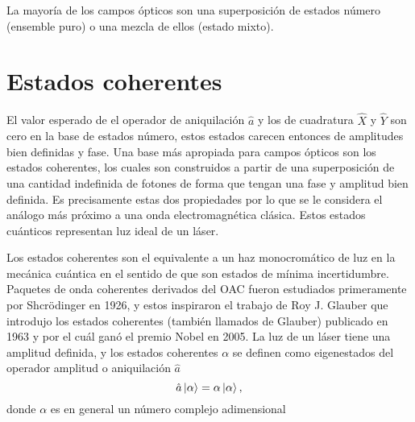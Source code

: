 La mayoría de los campos ópticos son una superposición de estados número (ensemble puro) o una mezcla de ellos (estado mixto).
\iffalse
  donde se considera la aportación de la energía del vacío. Usando la relación de conmutación de $\hat{a}$ y $\hat{a}^{\dagger}$ sobre el estado vacío $(\hat{a}\hat{a}^{\dagger}-\hat{a}^{\dagger}\hat{a})\ket{0} = \hat{a}\hat{a}^{\dagger}\ket{0} = \ket{0}$ implica que $\hat{a}^{\dagger}\hat{a}(\hat{a}^{\dagger}\ket{0}) = \hat{a}^{\dagger}\ket{0}$, por lo que $\hat{a}^{\dagger}\ket{0}$ es un eigenestado de $\hat{a}^{\dagger}\hat{a}$ con valor propio 1, a este estado se le denomina estado de un fotón y se denota como $\ket{1} = \hat{a}^{\dagger}\ket{0}$. De forma análoga, se puede obtener el n-ésimo estado de $n$ fotones $\ket{n}$ de forma inductiva, lo que resulta en
  \begin{equation*}
    \ket{n} = \frac{\hat{a}^{\dagger\,n}}{\sqrt{n!}}\ket{0}
  \end{equation*}
\fi
\section{Estados coherentes}
El valor esperado de el operador de aniquilación $\hat{a}$ y los de cuadratura $\hat{X}$ y $\hat{Y}$ son cero en la base de estados número, estos estados carecen entonces de amplitudes bien definidas y fase. Una base más apropiada para campos ópticos son los estados coherentes, los cuales son construidos a partir de una superposición de una cantidad indefinida de fotones de forma que tengan una fase y amplitud bien definida. Es precisamente estas dos propiedades por lo que se le considera el análogo más próximo a una onda electromagnética clásica. Estos estados cuánticos representan luz ideal de un láser.

Los estados coherentes son el equivalente a un haz monocromático de luz en la mecánica cuántica en el sentido de que son estados de mínima incertidumbre.  Paquetes de onda coherentes derivados del OAC fueron estudiados primeramente por Shcrödinger en 1926, y estos inspiraron el trabajo de Roy J. Glauber \cite{Glauber} que introdujo los estados coherentes (también llamados de Glauber) publicado en 1963 y por el cuál ganó el premio Nobel en 2005. La luz de un láser tiene una amplitud definida, y los estados coherentes $\alpha$ se definen como eigenestados del operador amplitud o aniquilación $\hat{a}$
\begin{equation*}
  \hat{a} \ket{\alpha} = \alpha\ket{\alpha},
\end{equation*}
donde $\alpha$ es en general un número complejo adimensional

